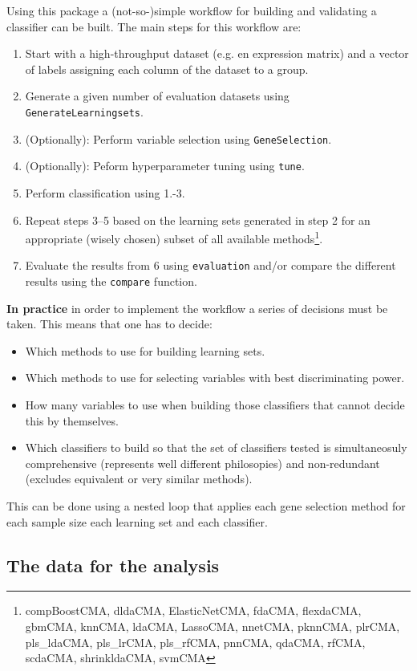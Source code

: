 \documentclass{article}\usepackage[]{graphicx}\usepackage[]{color}
\begin{document}
Using this package a (not-so-)simple workflow for building and validating a classifier can be built.
The main steps for this workflow are: 
\begin{enumerate}
\item Start with a high-throughput dataset (e.g. en expression matrix) and a vector of labels assigning each column of the dataset to a group.
\item 
Generate a given number of evaluation datasets using \texttt{GenerateLearningsets}.
\item 
(Optionally): Perform variable selection using \texttt{GeneSelection}.
\item 
(Optionally): Peform hyperparameter tuning using \texttt{tune}.
\item 
Perform classification using 1.-3.
\item 
Repeat steps 3--5 based on the learning sets generated in step 2 for an appropriate (wisely chosen) subset of all available methods\footnote{compBoostCMA, dldaCMA, ElasticNetCMA, fdaCMA, flexdaCMA, gbmCMA, knnCMA, ldaCMA, LassoCMA, nnetCMA, pknnCMA, plrCMA, pls_ldaCMA, pls_lrCMA, pls_rfCMA, pnnCMA, qdaCMA, rfCMA, scdaCMA, shrinkldaCMA, svmCMA}.
\item Evaluate the results from 6 using \texttt{evaluation} and/or compare the different results using the \texttt{compare} function.
\end{enumerate}

\textbf{In practice} in order to implement the workflow a series of decisions must be taken. This means that one has to decide:
\begin{itemize}
\item Which methods to use for building learning sets.
\item Which methods to use for selecting variables with best discriminating power.
\item How many variables to use when building those classifiers that cannot decide this by themselves.
\item Which classifiers to build so that the set of classifiers tested is simultaneosuly comprehensive (represents well different philosopies) and non-redundant (excludes equivalent or very similar methods).
\end{itemize}

This can be done using a nested loop that applies each gene selection
method for each sample size each learning set and each classifier.

\subsection{The data for the analysis}
\end{document}
